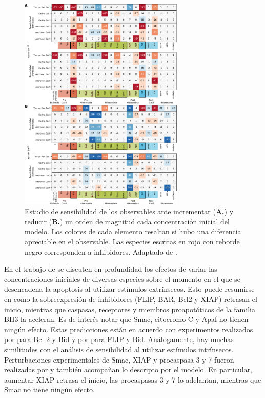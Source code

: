 \begin{figure}[t!]
    \centering
    \includegraphics[width=0.7\textwidth]{img/cap_4/sensitivity_10.pdf}
    \caption{\footnotesize{Estudio de sensibilidad de los observables ante incrementar (\textbf{A.}) y reducir (\textbf{B.}) un orden de magnitud cada concentración inicial del modelo. Los colores de cada elemento resaltan si hubo una diferencia apreciable en el observable. Las especies escritas en rojo con reborde negro corresponden a inhibidores. Adaptado de \cite{Corbat2021}.}}
    \label{fig:sensitividad10}
\end{figure}

En el trabajo de \cite{Gaudet2012} se discuten en profundidad los efectos de variar las concentraciones iniciales de diversas especies sobre el momento en el que se desencadena la apoptosis al utilizar estímulos extrínsecos. Esto puede resumirse en como la sobreexpresión de inhibidores (FLIP, BAR, Bcl2 y XIAP) retrasan el inicio, mientras que caspasas, receptores y miembros proapotóticos de la familia BH3 la aceleran. Es de interés notar que Smac, citocromo C y Apaf no tienen ningún efecto. Estas predicciones están en acuerdo con experimentos realizados por \cite{Gaudet2012} para Bcl-2 y Bid y por \cite{Spencer2009} para FLIP y Bid. Análogamente, hay muchas similitudes con el análisis de sensibilidad al utilizar estímulos intrínsecos. Perturbaciones experimentales de Smac, XIAP y procaspasa 3 y 7 fueron realizadas por \cite{Rehm2006} y también acompañan lo descripto por el modelo. En particular, aumentar XIAP retrasa el inicio, las procaspasas 3 y 7 lo adelantan, mientras que Smac no tiene ningún efecto.

